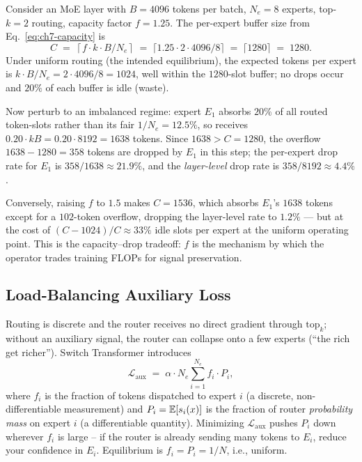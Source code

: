 \begin{workedexample}
Consider an MoE layer with $B = 4096$ tokens per batch, $N_e = 8$
experts, top-$k = 2$ routing, capacity factor $f = 1.25$. The
per-expert buffer size from Eq.~\eqref{eq:ch7-capacity} is
\[
C \;=\; \left\lceil f \cdot k \cdot B / N_e \right\rceil
  \;=\; \lceil 1.25 \cdot 2 \cdot 4096 / 8 \rceil
  \;=\; \lceil 1280 \rceil \;=\; 1280.
\]
Under uniform routing (the intended equilibrium), the expected tokens
per expert is $k \cdot B / N_e = 2 \cdot 4096 / 8 = 1024$, well
within the $1280$-slot buffer; no drops occur and $20\%$ of each
buffer is idle (waste).

Now perturb to an imbalanced regime: expert $E_1$ absorbs $20\%$ of
all routed token-slots rather than its fair $1/N_e = 12.5\%$, so
receives $0.20 \cdot k B = 0.20 \cdot 8192 = 1638$ tokens. Since
$1638 > C = 1280$, the overflow $1638 - 1280 = 358$ tokens are
dropped by $E_1$ in this step; the per-expert drop rate for $E_1$ is
$358/1638 \approx 21.9\%$, and the \emph{layer-level} drop rate is
$358 / 8192 \approx 4.4\%$.

Conversely, raising $f$ to $1.5$ makes $C = 1536$, which absorbs
$E_1$'s $1638$ tokens except for a $102$-token overflow, dropping the
layer-level rate to $1.2\%$ --- but at the cost of $(C - 1024)/C
\approx 33\%$ idle slots per expert at the uniform operating point.
This is the capacity--drop tradeoff: $f$ is the mechanism by which
the operator trades training FLOPs for signal preservation.
\end{workedexample}

\subsection{Load-Balancing Auxiliary Loss}

Routing is discrete and the router receives no direct gradient
through $\mathrm{top}_k$; without an auxiliary signal, the router can
collapse onto a few experts (``the rich get richer''). Switch
Transformer introduces
\begin{equation}
\label{eq:ch7-load-balance}
\mathcal{L}_{\mathrm{aux}}
   \;=\; \alpha \cdot N_e \sum_{i=1}^{N_e} f_i \cdot P_i,
\end{equation}
where $f_i$ is the fraction of tokens dispatched to expert $i$ (a
discrete, non-differentiable measurement) and $P_i = \mathbb{E}[s_i(x)]$ is
the fraction of router \emph{probability mass} on expert $i$ (a
differentiable quantity). Minimizing $\mathcal{L}_{\mathrm{aux}}$
pushes $P_i$ down wherever $f_i$ is large -- if the router is already
sending many tokens to $E_i$, reduce your confidence in $E_i$.
Equilibrium is $f_i = P_i = 1/N$, i.e., uniform.

